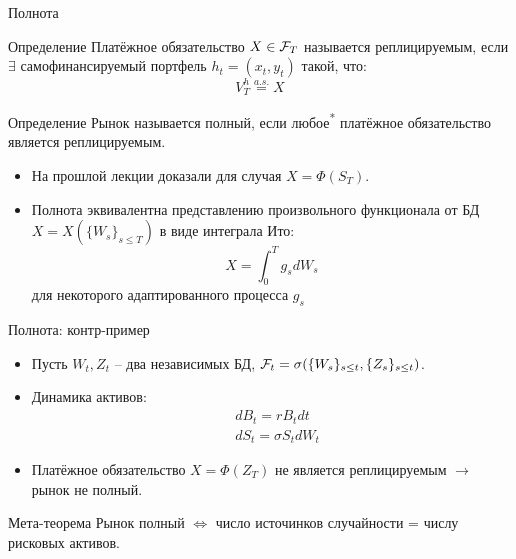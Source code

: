 \documentclass[aspectratio=169]{beamer}
\begin{document}
\begin{frame}{Полнота}
    \begin{block}{Определение}
        Платёжное обязательство $X\in\mathcal{F}_T$ называется реплицируемым, если $\exists$ самофинансируемый портфель $h_t=(x_t, y_t)$ такой, что:
        $$
            V_T^h \overset{a.s.}{=} X
        $$
    \end{block}
    \begin{block}{Определение}
        Рынок называется полный, если любое\textsuperscript{*} платёжное обязательство является реплицируемым.
    \end{block}
    \begin{itemize}
        \item На прошлой лекции доказали для случая $X = \Phi(S_T)$.
        \item Полнота эквивалентна представлению произвольного функционала от БД $X = X(\{W_s\}_{s \leq T})$ в виде интеграла Ито:
        $$
            X = \int_0^T g_s dW_s
        $$для некоторого адаптированного процесса $g_s$
    \end{itemize}
\end{frame}

\begin{frame}{Полнота: контр-пример}
    \begin{itemize}
        \item Пусть $W_t, Z_t$ -- два независимых БД, $\mathcal{F}_t = \sigma( \{W_s\}_{s\leq t}, \{Z_s\}_{s\leq t} )$.
        \item Динамика активов:
            \begin{align*}
                &dB_t = r B_t dt \\
                &dS_t = \sigma S_t dW_t
            \end{align*}
        \item Платёжное обязательство $X = \Phi(Z_T)$ не является реплицируемым $\to$ рынок не полный.
    \end{itemize}
    \begin{block}{Мета-теорема}
        Рынок полный $\Leftrightarrow$ число источинков случайности = числу рисковых активов.
    \end{block}
\end{frame}
\end{document}
